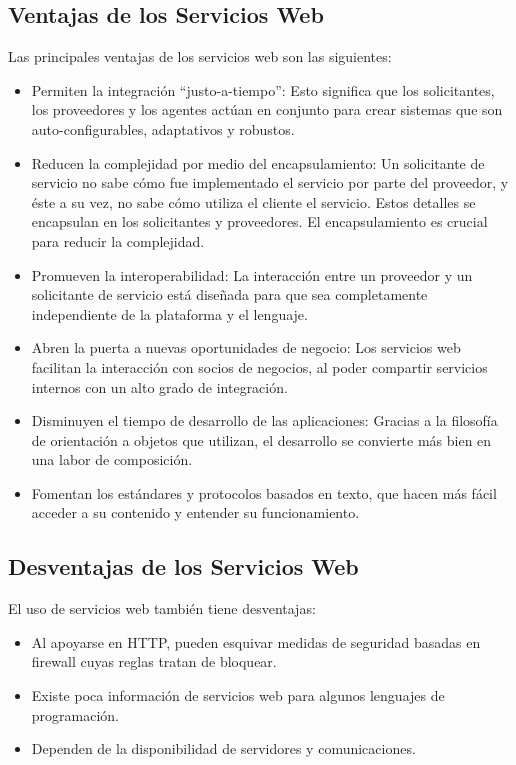 \subsection{Ventajas de los  Servicios Web}
\label{cap:subsec:ventajasserviciosweb}
	Las principales ventajas de los servicios web son las siguientes:
\begin{itemize}
	\item Permiten la integración “justo-a-tiempo”:  Esto significa que los solicitantes, los proveedores y los agentes actúan en conjunto para crear sistemas que son auto-configurables, adaptativos y robustos.
	\item Reducen la complejidad por medio del encapsulamiento: Un solicitante de servicio no sabe cómo fue implementado el servicio por parte del proveedor, y éste a su vez, no sabe cómo utiliza el cliente el servicio. Estos detalles se encapsulan en los solicitantes y proveedores. El encapsulamiento es crucial para reducir la complejidad.
	\item Promueven la interoperabilidad: La interacción entre un proveedor y un solicitante de servicio está diseñada para que sea completamente independiente de la plataforma y el lenguaje. 
	\item Abren la puerta a nuevas oportunidades de negocio: Los servicios web facilitan la interacción con socios de negocios, al poder compartir servicios internos con un alto grado de integración.
	\item Disminuyen el tiempo de desarrollo de las aplicaciones: Gracias a la filosofía de orientación a objetos que utilizan, el desarrollo se convierte más bien en una labor de composición.
	\item Fomentan los estándares y protocolos basados en texto, que hacen más fácil acceder a su contenido y entender su funcionamiento.
\end{itemize}

\subsection{Desventajas de los  Servicios Web}
\label{cap:subsec:desventajasserviciosweb}
	El uso de servicios web también tiene desventajas:
\begin{itemize}
	\item Al apoyarse en HTTP, pueden esquivar medidas de seguridad basadas en firewall cuyas reglas tratan de bloquear.
	\item Existe poca información de servicios web para algunos lenguajes de programación.
	\item Dependen de la disponibilidad de servidores y comunicaciones.
\end{itemize}




